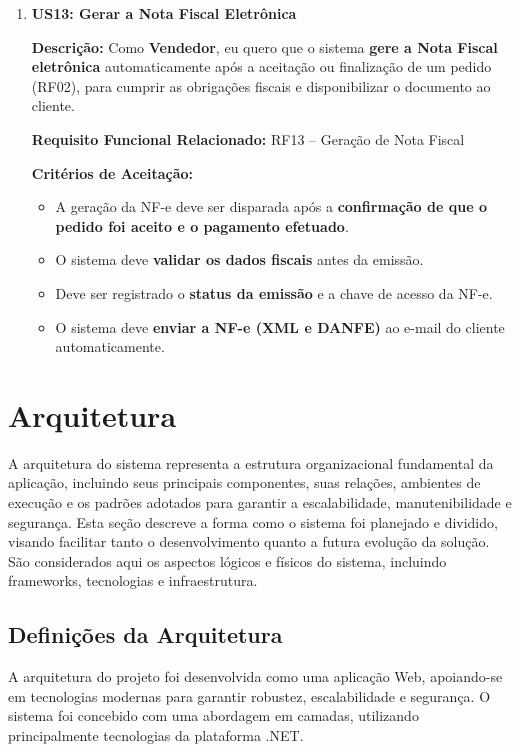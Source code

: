 \documentclass[
	12pt,				%
	openany,			%
	twoside,			%
	a4paper,			%
	english,			%
	brazil				%
	]{abntex2}
\begin{document}
\begin{enumerate}
\item \textbf{US13: Gerar a Nota Fiscal Eletrônica}

\textbf{Descri\c{c}\~ao:} Como \textbf{Vendedor}, eu quero que o sistema \textbf{gere a Nota Fiscal eletrônica} automaticamente após a aceitação ou finalização de um pedido (RF02), para cumprir as obrigações fiscais e disponibilizar o documento ao cliente.

\textbf{Requisito Funcional Relacionado:} RF13 -- Geração de Nota Fiscal

\textbf{Crit\'erios de Aceita\c{c}\~ao:}
\begin{itemize}
  \item A geração da NF-e deve ser disparada após a \textbf{confirmação de que o pedido foi aceito e o pagamento efetuado}.
  \item O sistema deve \textbf{validar os dados fiscais} antes da emissão.
  \item Deve ser registrado o \textbf{status da emissão} e a chave de acesso da NF-e.
  \item O sistema deve \textbf{enviar a NF-e (XML e DANFE)} ao e-mail do cliente automaticamente.
\end{itemize}

\end{enumerate}


\section{Arquitetura}

A arquitetura do sistema representa a estrutura organizacional fundamental da aplicação, incluindo seus principais componentes, suas relações, ambientes de execução e os padrões adotados para garantir a escalabilidade, manutenibilidade e segurança. Esta seção descreve a forma como o sistema foi planejado e dividido, visando facilitar tanto o desenvolvimento quanto a futura evolução da solução. São considerados aqui os aspectos lógicos e físicos do sistema, incluindo frameworks, tecnologias e infraestrutura.


\subsection{Definições da Arquitetura}

A arquitetura do projeto foi desenvolvida como uma aplicação Web, apoiando-se em tecnologias modernas para garantir robustez, escalabilidade e segurança. O sistema foi concebido com uma abordagem em camadas, utilizando principalmente tecnologias da plataforma .NET.
\end{document}
